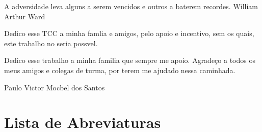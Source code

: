 \documentclass{./public/ufpatccdoisautores}
\begin{document}

\begin{ufpaEpigrafe}
A adversidade leva alguns a serem vencidos e
 outros a baterem recordes. William Arthur Ward
\end{ufpaEpigrafe}

\ufpaPaginaDeAprovacao

\begin{ufpaOferecimento}
    Dedico esse TCC a minha famlia e amigos, pelo apoio e incentivo,
    sem os quais, este trabalho no seria possvel.
\end{ufpaOferecimento}

\begin{ufpaAgradecimentos}

		Dedico esse trabalho a minha familia que sempre me apoio. Agradeço a todos os meus amigos e colegas de turma, por terem me ajudado nessa caminhada.

    \begin{flushright}
        Paulo Victor Mocbel dos Santos
    \end{flushright}

\end{ufpaAgradecimentos}

\tableofcontents    \clearpage

\listoffigures \clearpage \listoftables \clearpage

\chapter*{Lista de Abreviaturas}
\end{document}
